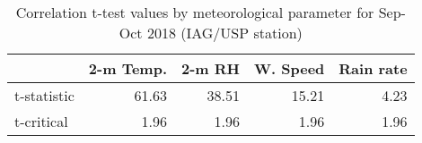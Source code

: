 \begin{table}
\centering
\caption{Correlation t-test values by meteorological parameter for Sep-Oct 2018 (IAG/USP station)}
\label{tab: r_sign_iag}
\begin{tabular}{lrrrr}
\toprule
{} &  2-m Temp. &   2-m RH &  W. Speed &  Rain rate \\
\midrule
t-statistic &  61.63 &  38.51 &  15.21 &  4.23 \\
t-critical  &   1.96 &   1.96 &   1.96 &  1.96 \\
\bottomrule
\end{tabular}
\end{table}


